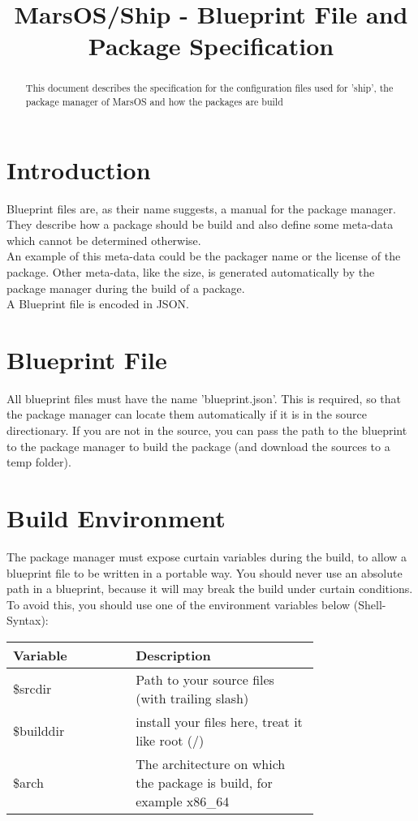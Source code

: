 \documentclass[]{article}
\title{MarsOS/Ship - Blueprint File and Package Specification}
\begin{document}
\maketitle

\begin{abstract}
\noindent This document describes the specification for the configuration files used for 'ship', the package manager of MarsOS and how the packages are build
\end{abstract}
\vspace{25px}
\begin{multicols}{2}
	\section{Introduction}
	Blueprint files are, as their name suggests, a manual
	for the package manager. They describe how a package
	should be build and also define some meta-data which
	cannot be determined otherwise.\\
	An example of this meta-data could be the packager name
	or the license of the package. Other meta-data, like the size, is generated automatically by the package
	manager during the build of a package.\\
	A Blueprint file is encoded in JSON.
	\section{Blueprint File}
	All blueprint files must have the name 'blueprint.json'.
	This is required, so that the package manager can
	locate them automatically if it is in the source
	directionary. If you are not in the source, you can
	pass the path to the blueprint to the package manager
	to build the package (and download the sources to
	a temp folder).
	\section{Build Environment}
	The package manager must expose curtain variables
	during the build, to allow a blueprint file to be
	written in a portable way.
	You should never use an absolute path in a blueprint,
	because it will may break the build under curtain
	conditions. To avoid this, you should use one of
	the environment variables below (Shell-Syntax):
	
	\begin{tabular}{|p{0.3\linewidth}|p{0.45\linewidth}|}
		\hline
		Variable & Description \\\hline
		\$srcdir & Path to your source files (with trailing slash) \\\hline
		\$builddir & install your files here, treat it like root (/) \\\hline
		\$arch & The architecture on which the package is build, for example x86\_64 \\\hline
	\end{tabular}
	\pagebreak

\end{multicols}
\end{document}
